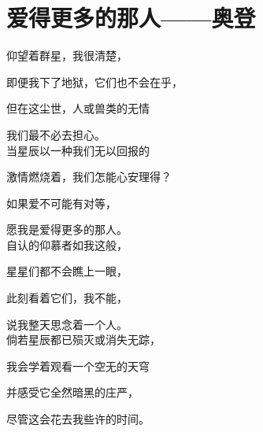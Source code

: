 
\section{爱得更多的那人——奥登}

仰望着群星，我很清楚，

即便我下了地狱，它们也不会在乎，

但在这尘世，人或兽类的无情

我们最不必去担心。\\


当星辰以一种我们无以回报的

激情燃烧着，我们怎能心安理得？

如果爱不可能有对等，

愿我是爱得更多的那人。\\


自认的仰慕者如我这般，

星星们都不会瞧上一眼，

此刻看着它们，我不能，

说我整天思念着一个人。\\


倘若星辰都已殒灭或消失无踪，

我会学着观看一个空无的天穹

并感受它全然暗黑的庄严，

尽管这会花去我些许的时间。